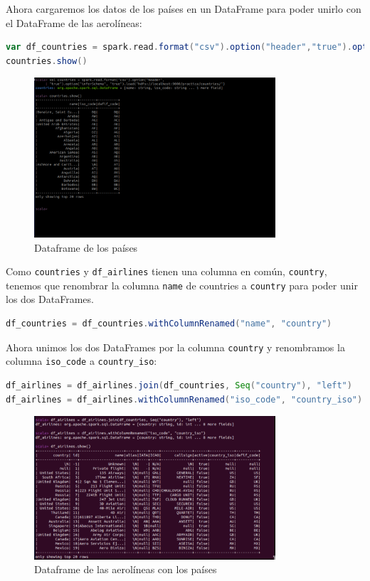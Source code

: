 Ahora cargaremos los datos de los países en un DataFrame para poder unirlo con el DataFrame de las aerolíneas:

\begin{lstlisting}[language=scala]
var df_countries = spark.read.format("csv").option("header","true").option("inferSchema", "true").load("hdfs://localhost:9000/practica/countries/")
countries.show()
\end{lstlisting}

\begin{figure}[H]
    \centering
    \includegraphics[width=0.8\textwidth]{figures/37.png}
    \caption{Dataframe de los países}
    \label{fig:countries_df_from_hdfs}
\end{figure}

Como \texttt{countries} y \texttt{df\_airlines} tienen una columna en común, \texttt{country}, tenemos que renombrar la columna \texttt{name} de countries a \texttt{country} para poder unir los dos DataFrames.

\begin{lstlisting}[language=scala]
df_countries = df_countries.withColumnRenamed("name", "country")
\end{lstlisting}

Ahora unimos los dos DataFrames por la columna \texttt{country} y renombramos la columna \texttt{iso_code} a \texttt{country_iso}:

\begin{lstlisting}[language=scala]
df_airlines = df_airlines.join(df_countries, Seq("country"), "left")
df_airlines = df_airlines.withColumnRenamed("iso_code", "country_iso")
\end{lstlisting}

\begin{figure}[H]
    \centering
    \includegraphics[width=0.8\textwidth]{figures/38.png}
    \caption{Dataframe de las aerolíneas con los países}
    \label{fig:airlines_countries_df}
\end{figure}

